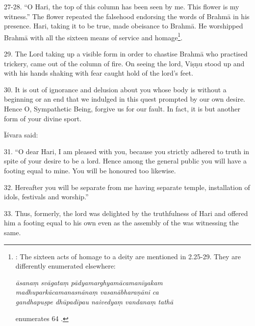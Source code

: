 27-28. “O Hari, the top of this column has been seen by me. This 
flower is my witness.” The  flower repeated the falsehood endorsing
the words of Brahmā in his presence. Hari, taking it to be true, made obeisance
to Brahmā. He worshipped Brahmā with all the sixteen means of service and
homage\footnote{: The sixteen acts of homage to a deity are
mentioned in  2.25-29. They are differently enumerated
elsewhere:

\begin{shloka}\itshape
  āsanaṃ svāgataṃ pādyamarghyamācamanīyakam \\
  madhuparkācamanasnānaṃ vasanābharaṇāni ca \\
  gandhapuṣpe dhūpadīpau naivedyaṃ vandanaṃ tathā
\end{shloka}

 enumerates 64 .}.

29. The Lord taking up a visible form in order to chastise Brahmā who practised
trickery, came out of the column of fire. On seeing the lord, Viṣṇu stood up and
with his hands shaking with fear caught hold of the lord’s feet.

30. It is out of ignorance and delusion about you whose body is without a
beginning or an end that we indulged in this quest prompted by our own desire.
Hence O, Sympathetic Being, forgive us for our fault. In fact, it is but another
form of your divine sport.

Īśvara said:

31. “O dear Hari, I am pleased with you, because you strictly adhered to truth
in spite of your desire to be a lord. Hence among the general public you will
have a footing equal to mine. You will be honoured too likewise.

32. Hereafter you will be separate from me having separate temple, installation
of idols, festivals and worship.”

33. Thus, formerly, the lord was delighted by the truthfulness of Hari and
offered him a footing equal to his own even as the assembly of the 
was witnessing the same.
